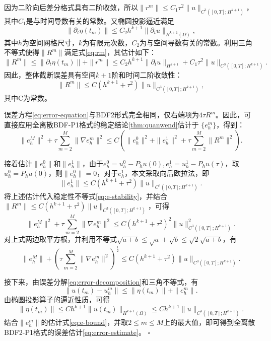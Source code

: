 \documentclass{GZUbachelorthesis}
\makeatletter
\renewcommand{\proofname}{证明}
\renewenvironment{proof}[1][\proofname]{\par
	\normalfont
	\topsep6\p@\@plus6\p@\relax
	\trivlist
	\setlength{\itemindent}{2em}%
	\item[\hskip\labelsep{\songti #1：}]\ignorespaces
}{\hfill\ensuremath{\square}\endtrivlist\@endpefalse}
\theoremstyle{chineseplain}
\makeatother
\begin{document}
\begin{proof}
因为二阶向后差分格式具有二阶收敛，所以$\|r^m\| \leq C_1 \tau^2 \|u\|_{C^3([0,T];H^{k+1})}$，其中$C_1$是与时间导数有关的常数。又椭圆投影逼近满足
\begin{equation}
	\|\partial_{t} \eta(t_m)\| \leq C_2 h^{k+1} \|\partial_t u\|_{H^{k+1}(\Omega)},
\end{equation}
其中$h$为空间网格尺寸，$k$为有限元次数，$C_2$为与空间导数有关的常数。利用三角不等式使得$\|R^m\|$满足式\eqref{eq:rm}，其估计如下：
\begin{equation}\label{eq:rm}
	\|R^m\| \leq \|\partial_t \eta(t_m)\| + \|r^m\| \leq C_2 h^{k+1} \|\partial_t u\|_{H^{k+1}} + C_1 \tau^2 \|u\|_{C^3([0,T];H^{k+1})}.
\end{equation}
因此，整体截断误差具有空间$k+1$阶和时间二阶收敛性：
\begin{equation}
	\|R^m\| \leq C (h^{k+1} + \tau^2)\|u\|_{C^3([0,T];H^{k+1})},
\end{equation}
其中C为常数。

误差方程\eqref{eq:error-equation}与BDF2形式完全相同，仅右端项为$4\tau R^m$。因此，可直接应用全离散BDF-P1格式的稳定结论\eqref{thm:quanwend}估计于 $\{e_h^m\}$，得到：
\begin{equation}\label{eq:e-stability}
	\|e_h^M\|^2+ \tau \sum_{m=2}^M \|\nabla e_h^m\|^2 \leq C \left( \|e_h^0\|^2 + \|e_h^1\|^2 + \tau \sum_{m=2}^M \|R^m\|^2 \right).
\end{equation}

接着估计$\|e_h^0\|$和$\|e_h^1\|$，由于$e_h^0=u_h^0-P_h u(0),e_h^1=u_h^1-P_h u(\tau)$，取$u_h^0 = P_h u(0)$，则$\|e_h^0\| = 0$，对于$e_h^1$，本文采取向后欧拉法，即
\begin{equation}\label{eq:begin-error}
		\|e_h^1\| \leq C (h^{k+1} + \tau^2)\|u\|_{C^3([0,T];H^{k+1})}.
\end{equation}
将上述估计代入稳定性不等式\eqref{eq:e-stability}，并结合$\|R^m\| \leq C (h^{k+1} + \tau^2)\|u\|_{C^3([0,T];H^{k+1})}$，可得
\begin{equation}
	\|e_h^M\|^2 + \tau \sum_{m=2}^M \|\nabla e_h^m\|^2 \leq C (h^{k+1} + \tau^2)^2 \|u\|_{C^3([0,T];H^{k+1})}^2.
\end{equation}
对上式两边取平方根，并利用不等式$\sqrt{a+b} \leq \sqrt{a} + \sqrt{b} \leq \sqrt{2}\sqrt{a+b}$，有
\begin{equation}\label{eq:e-bound}
	\|e_h^M\| + \left(\tau \sum_{m=2}^M \|\nabla e_h^m\|^2\right)^{\frac{1}{2}} \leq C (h^{k+1} + \tau^2) \|u\|_{C^3([0,T];H^{k+1})}.
\end{equation}

接下来，由误差分解\eqref{eq:error-decomposition}和三角不等式，有
\begin{equation}\label{eq:triangle-l2}
	\|u(t_m) - u_h^m\| \leq \|\eta(t_m)\| + \|e_h^m\|.
\end{equation}
由椭圆投影算子的逼近性质，可得
\begin{equation}\label{eq:eta-bound}
	\|\eta(t_m)\| \leq C h^{k+1} \|u(t_m)\|_{H^{k+1}(\Omega)} \leq C h^{k+1} \|u\|_{C^3([0,T];H^{k+1})}.
\end{equation}
结合$\|e_h^m\|$的估计式\eqref{eq:e-bound}，并取$2 \leq m \leq M$上的最大值，即可得到全离散BDF2-P1格式的误差估计\eqref{eq:error-estimate}。
\end{proof}
\end{document}
